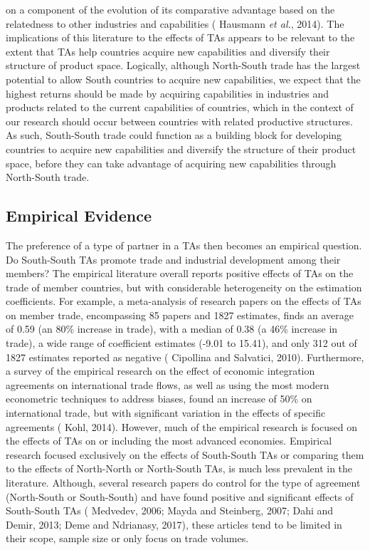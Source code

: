 \documentclass[12pt]{article}%
\begin{document}
on a component of the evolution of its comparative advantage based on
the relatedness to other industries and capabilities (\cite{hausmann_implied_2014} Hausmann \emph{et
al.}, 2014). The implications of this literature to the effects of TAs
appears to be relevant to the extent that TAs help countries acquire new
capabilities and diversify their structure of product space. Logically,
although North-South trade has the largest potential to allow South
countries to acquire new capabilities, we expect that the highest
returns should be made by acquiring capabilities in industries and
products related to the current capabilities of countries, which in the
context of our research should occur between countries with related
productive structures. As such, South-South trade could function as a
building block for developing countries to acquire new capabilities and
diversify the structure of their product space, before they can take
advantage of acquiring new capabilities through North-South trade.%
\subsection{Empirical Evidence}%
\label{subsec:EmpiricalEvidence}%

%
The preference of a type of partner in a TAs then becomes an empirical
question. Do South-South TAs promote trade and industrial development
among their members? The empirical literature overall reports positive
effects of TAs on the trade of member countries, but with considerable
heterogeneity on the estimation coefficients. For example, a
meta-analysis of research papers on the effects of TAs on member trade,
encompassing 85 papers and 1827 estimates, finds an average of 0.59 (an
80\% increase in trade), with a median of 0.38 (a 46\% increase in
trade), a wide range of coefficient estimates (-9.01 to 15.41), and only
312 out of 1827 estimates reported as negative (\cite{cipollina_reciprocal_2010} Cipollina and Salvatici,
2010). Furthermore, a survey of the empirical research on the effect of
economic integration agreements on international trade flows, as well as
using the most modern econometric techniques to address biases, found an
increase of 50\% on international trade, but with significant variation
in the effects of specific agreements (\cite{kohl_we_2014} Kohl, 2014). However, much of the
empirical research is focused on the effects of TAs on or including the
most advanced economies. Empirical research focused exclusively on the
effects of South-South TAs or comparing them to the effects of
North-North or North-South TAs, is much less prevalent in the
literature. Although, several research papers do control for the type of
agreement (North-South or South-South) and have found positive and
significant effects of South-South TAs (\cite{medvedev_preferential_2006} Medvedev, 2006; \cite{mayda_south-south_2007} Mayda and
Steinberg, 2007; \cite{dahi_preferential_2013} Dahi and Demir, 2013; \cite{deme_trade-creation_2017} Deme and Ndrianasy, 2017), these
articles tend to be limited in their scope, sample size or only focus on
trade volumes.
\end{document}

